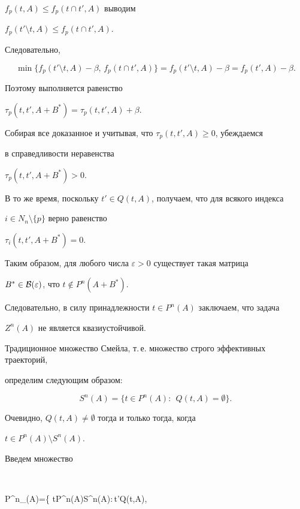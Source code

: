 \begin{pf}
$f_p(t, A)\le f_p(t\cap t', A)$ выводим


$f_p(t'\setminus t, A)\le f_p(t\cap t', A)$.


Следовательно,


$$


\min \{f_p(t'\setminus t,A)-\beta,\, f_p(t\cap t', A)\}=


f_p(t'\setminus t,A)-\beta=f_p(t',A)-\beta.


$$


Поэтому выполняется равенство


$\tau_p(t,t',A+B^*)=\tau_p(t,t',A)+\beta$.


Собирая все доказанное и учитывая, что $\tau_p(t,t',A)\ge 0$, убеждаемся


в справедливости неравенства


$\tau_p(t,t',A+B^*)>0$.


В то же время, поскольку $t'\in Q(t,A)$, получаем, что для всякого индекса


$i\in N_n\setminus \{p\}$ верно равенство


$\tau_i(t,t',A+B^*)=0$.





Таким образом, для любого числа $\varepsilon>0$ существует такая матрица


$B^*\in\cal B(\varepsilon)$, что $t\notin P^n(A+B^*)$.


Следовательно, в силу принадлежности $t\in P^n(A)$ заключаем, что задача


$Z^n(A)$ не является квазиустойчивой.


\end{pf}





Традиционное множество Смейла, т.\,е. множество строго эффективных траекторий,


определим следующим образом:


$$


S^n(A) =\{t\in P^n(A):\ \ Q (t,A) =\emptyset\}.


$$


Очевидно, $Q (t,A)\ne \emptyset$ тогда и только тогда, когда


$t\in P^n(A)\setminus S^n(A)$.





Введем множество


$$


P^n_{\alpha}(A)=\{ t\in P^n(A)\setminus S^n(A):\,\forall t'\in Q(t,A),


